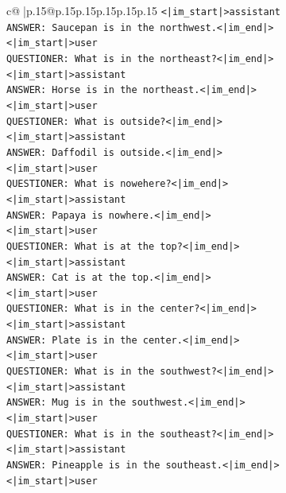 \documentclass{article}
\begin{document}
{\begin{supertabular}{c@{$\;$}|p{.15\linewidth}@{}p{.15\linewidth}p{.15\linewidth}p{.15\linewidth}p{.15\linewidth}p{.15\linewidth}}
{{{\texttt{<|im\_start|>assistant} \\
\texttt{ANSWER: Saucepan is in the northwest.<|im\_end|>} \\
\texttt{<|im\_start|>user} \\
\texttt{QUESTIONER: What is in the northeast?<|im\_end|>} \\
\texttt{<|im\_start|>assistant} \\
\texttt{ANSWER: Horse is in the northeast.<|im\_end|>} \\
\texttt{<|im\_start|>user} \\
\texttt{QUESTIONER: What is outside?<|im\_end|>} \\
\texttt{<|im\_start|>assistant} \\
\texttt{ANSWER: Daffodil is outside.<|im\_end|>} \\
\texttt{<|im\_start|>user} \\
\texttt{QUESTIONER: What is nowehere?<|im\_end|>} \\
\texttt{<|im\_start|>assistant} \\
\texttt{ANSWER: Papaya is nowhere.<|im\_end|>} \\
\texttt{<|im\_start|>user} \\
\texttt{QUESTIONER: What is at the top?<|im\_end|>} \\
\texttt{<|im\_start|>assistant} \\
\texttt{ANSWER: Cat is at the top.<|im\_end|>} \\
\texttt{<|im\_start|>user} \\
\texttt{QUESTIONER: What is in the center?<|im\_end|>} \\
\texttt{<|im\_start|>assistant} \\
\texttt{ANSWER: Plate is in the center.<|im\_end|>} \\
\texttt{<|im\_start|>user} \\
\texttt{QUESTIONER: What is in the southwest?<|im\_end|>} \\
\texttt{<|im\_start|>assistant} \\
\texttt{ANSWER: Mug is in the southwest.<|im\_end|>} \\
\texttt{<|im\_start|>user} \\
\texttt{QUESTIONER: What is in the southeast?<|im\_end|>} \\
\texttt{<|im\_start|>assistant} \\
\texttt{ANSWER: Pineapple is in the southeast.<|im\_end|>} \\
\texttt{<|im\_start|>user} \\
}}}
\end{supertabular}}
\end{document}
